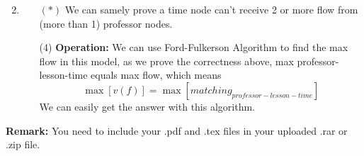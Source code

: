 \documentclass[12pt,a4paper]{article}
\makeatletter
\newtheorem*{solution}{Solution}
\theoremstyle{definition}
\renewenvironment{solution}[1][Solution] {\par\pushQED{\qed}\normalfont\topsep6\p@\@plus6\p@\relax\trivlist\item[\hskip\labelsep\bfseries#1\@addpunct{.}]\ignorespaces}{\popQED\endtrivlist\@endpefalse} \makeatother
\makeatother
\begin{document}
\begin{enumerate}
\begin{solution}
\begin{itemize}
$(*)$ We can samely prove a time node can't receive 2 or more flow from (more than 1) professor nodes.
\item [(4)] \textbf{Operation:} We can use Ford-Fulkerson Algorithm to find the max flow in this model, as we prove the correctness above, max professor-lesson-time equals max flow, which means
$$\max[ v(f)] = \max[ matching_{professor-lesson-time}]$$
We can easily get the answer with this algorithm.
\end{itemize}
\end{solution}

\end{enumerate}

\vspace{20pt}

\textbf{Remark:} You need to include your .pdf and .tex files in your uploaded .rar or .zip file.

\end{document}
